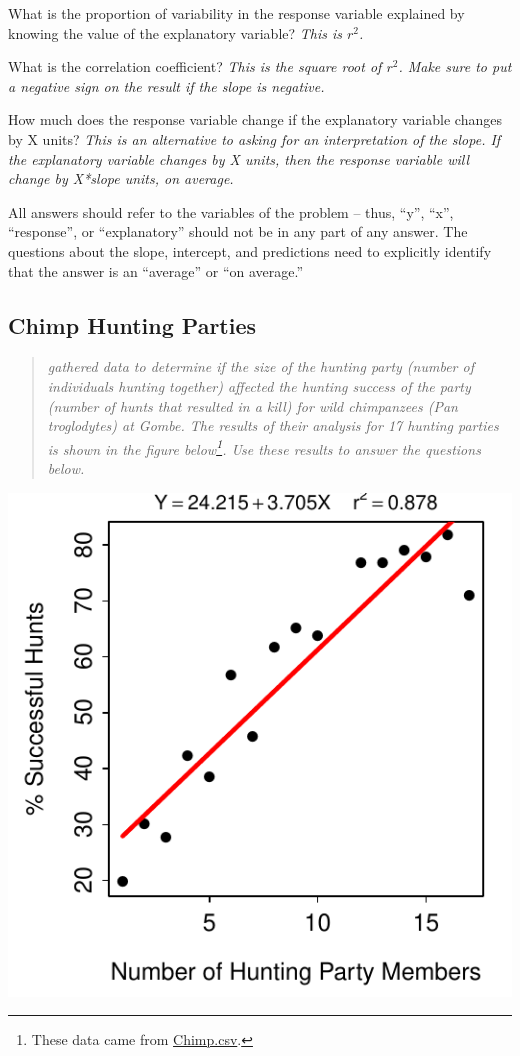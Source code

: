 \documentclass[10pt,openany]{book}\usepackage[]{graphicx}\usepackage[]{color}
\newenvironment{knitrout}{}{} %
\begin{document}
\begin{Enumerate}
  \item What is the proportion of variability in the response variable explained by knowing the value of the explanatory variable?  \textit{This is $r^{2}$.}
  \item What is the correlation coefficient?  \textit{This is the square root of $r^{2}$.  Make sure to put a negative sign on the result if the slope is negative.}
  \item How much does the response variable change if the explanatory variable changes by X units?  \textit{This is an alternative to asking for an interpretation of the slope.  If the explanatory variable changes by X units, then the response variable will change by X*slope units, on average.}
\end{Enumerate}

All answers should refer to the variables of the problem -- thus, ``y'', ``x'', ``response'', or ``explanatory'' should not be in any part of any answer.  The questions about the slope, intercept, and predictions need to explicitly identify that the answer is an ``average'' or ``on average.''

\subsection*{Chimp Hunting Parties}
\begin{quote}
\textit{\cite{Stanford1996} gathered data to determine if the size of the hunting party (number of individuals hunting together) affected the hunting success of the party (number of hunts that resulted in a kill) for wild chimpanzees (Pan troglodytes) at Gombe.  The results of their analysis for 17 hunting parties is shown in the figure below\footnote{These data came from \href{https://raw.githubusercontent.com/droglenc/NCData/master/Chimp.csv}{Chimp.csv}.}.  Use these results to answer the questions below.}
\end{quote}

\begin{knitrout}
\color{fgcolor}

{\centering \includegraphics[width=.4\linewidth]{Figs/ChimpFLP-1} 

}



\end{knitrout}
\end{document}
